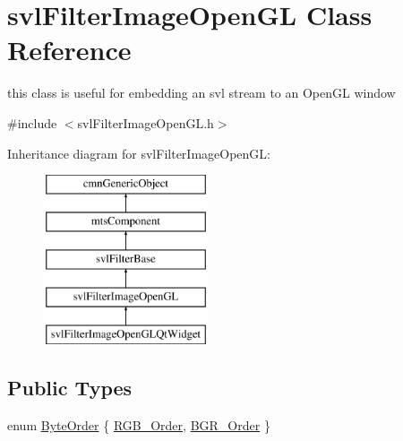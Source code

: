 \hypertarget{classsvl_filter_image_open_g_l}{\section{svl\-Filter\-Image\-Open\-G\-L Class Reference}
\label{classsvl_filter_image_open_g_l}
}


this class is useful for embedding an svl stream to an Open\-G\-L window  




{\ttfamily \#include $<$svl\-Filter\-Image\-Open\-G\-L.\-h$>$}

Inheritance diagram for svl\-Filter\-Image\-Open\-G\-L\-:\begin{figure}[H]
\begin{center}
\leavevmode
\includegraphics[height=5.000000cm]{d3/dcf/classsvl_filter_image_open_g_l}
\end{center}
\end{figure}
\subsection*{Public Types}
\begin{DoxyCompactItemize}
\item 
enum \hyperlink{classsvl_filter_image_open_g_l_aebab8852e9b2fd8bc2fb69c7ce788d3f}{Byte\-Order} \{ \hyperlink{classsvl_filter_image_open_g_l_aebab8852e9b2fd8bc2fb69c7ce788d3fa0a28f9264131c7b9b5ec54c0497091f3}{R\-G\-B\-\_\-\-Order}, 
\hyperlink{classsvl_filter_image_open_g_l_aebab8852e9b2fd8bc2fb69c7ce788d3faf5fa66f50f54a7febaa882e293c97526}{B\-G\-R\-\_\-\-Order}
 \}
\end{DoxyCompactItemize}
